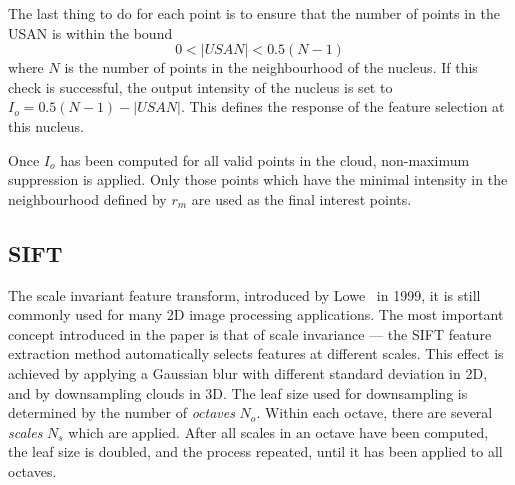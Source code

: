 \documentclass[11pt,a4paper]{kth-mag}
\begin{document}
The last thing to do for each point is to ensure that the number of points in
the USAN is within the bound
\begin{equation}
  \label{eq:13}
  0 < \left| USAN \right| < 0.5(N-1)
\end{equation}
where $N$ is the number of points in the neighbourhood of the nucleus. If this
check is successful, the output intensity of the nucleus is set to
$I_o=0.5(N-1)-\left|USAN\right|$. This defines the response of the feature
selection at this nucleus.


Once $I_o$ has been computed for all valid points in the cloud, non-maximum
suppression is applied. Only those points which have the minimal intensity in
the neighbourhood defined by $r_m$ are used as the final interest points.

\subsection{SIFT}
The scale invariant feature transform, introduced by
Lowe~\cite{lowe2004distinctive} in 1999, it is still commonly used for many 2D
image processing applications. The most important concept introduced in the
paper is that of scale invariance --- the SIFT feature extraction method
automatically selects features at different scales. This effect is achieved by
applying a Gaussian blur with different standard deviation in 2D, and by
downsampling clouds in 3D. The leaf size used for downsampling is determined by
the number of \emph{octaves} $N_o$. Within each octave, there are several
\emph{scales} $N_s$ which are applied. After all scales in an octave have been
computed, the leaf size is doubled, and the process repeated, until it has been
applied to all octaves.
\end{document}
